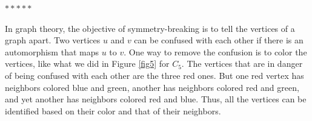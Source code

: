 \documentclass[11pt]{article}
\begin{document}





\bigskip %
\centerline{$*  *  *  * *$}
\bigskip %
\medskip

In graph theory, the objective of symmetry-breaking is to tell the vertices of a graph apart.  Two vertices $u$ and $v$ can be confused with each other if there is an automorphism that maps $u$ to $v$.  One way to remove the confusion is to color the vertices, like what we did in   Figure \ref{fig5} for $C_5$.  
The vertices that are in danger of being confused with each other are the three red ones.  But one red vertex has  neighbors colored blue and green, another has neighbors colored red and green,  and yet another has neighbors colored red and blue.  Thus, all the vertices can be identified based on their color and that of their neighbors. 




\end{document}
